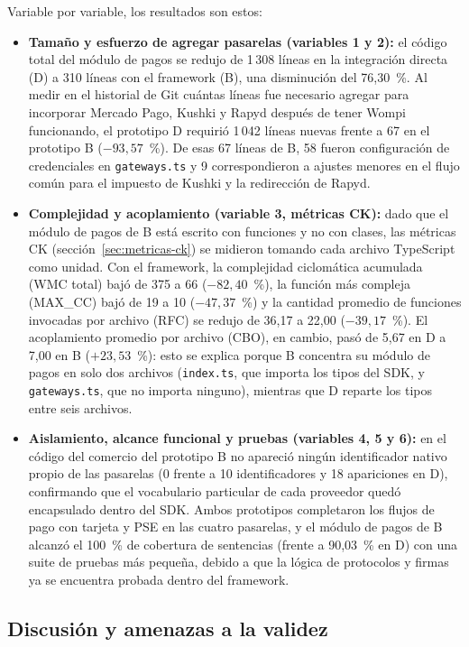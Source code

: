 Variable por variable, los resultados son estos:
\begin{itemize}
    \item \textbf{Tamaño y esfuerzo de agregar pasarelas (variables 1 y 2):} el código total del módulo de pagos se redujo de 1\,308 líneas en la integración directa (D) a 310 líneas con el framework (B), una disminución del 76,30~\%. Al medir en el historial de Git cuántas líneas fue necesario agregar para incorporar Mercado Pago, Kushki y Rapyd después de tener Wompi funcionando, el prototipo D requirió 1\,042 líneas nuevas frente a 67 en el prototipo B ($-93{,}57$~\%). De esas 67 líneas de B, 58 fueron configuración de credenciales en \texttt{gateways.ts} y 9 correspondieron a ajustes menores en el flujo común para el impuesto de Kushki y la redirección de Rapyd.
    \item \textbf{Complejidad y acoplamiento (variable 3, métricas CK):} dado que el módulo de pagos de B está escrito con funciones y no con clases, las métricas CK (sección~\ref{sec:metricas-ck}) se midieron tomando cada archivo TypeScript como unidad. Con el framework, la complejidad ciclomática acumulada (WMC total) bajó de 375 a 66 ($-82{,}40$~\%), la función más compleja (MAX\_CC) bajó de 19 a 10 ($-47{,}37$~\%) y la cantidad promedio de funciones invocadas por archivo (RFC) se redujo de 36,17 a 22,00 ($-39{,}17$~\%). El acoplamiento promedio por archivo (CBO), en cambio, pasó de 5,67 en D a 7,00 en B ($+23{,}53$~\%): esto se explica porque B concentra su módulo de pagos en solo dos archivos (\texttt{index.ts}, que importa los tipos del SDK, y \texttt{gateways.ts}, que no importa ninguno), mientras que D reparte los tipos entre seis archivos.
    \item \textbf{Aislamiento, alcance funcional y pruebas (variables 4, 5 y 6):} en el código del comercio del prototipo B no apareció ningún identificador nativo propio de las pasarelas (0 frente a 10 identificadores y 18 apariciones en D), confirmando que el vocabulario particular de cada proveedor quedó encapsulado dentro del SDK. Ambos prototipos completaron los flujos de pago con tarjeta y PSE en las cuatro pasarelas, y el módulo de pagos de B alcanzó el 100~\% de cobertura de sentencias (frente a 90,03~\% en D) con una suite de pruebas más pequeña, debido a que la lógica de protocolos y firmas ya se encuentra probada dentro del framework.
\end{itemize}

\subsection{Discusión y amenazas a la validez}
\label{sec:vii-discusion}

